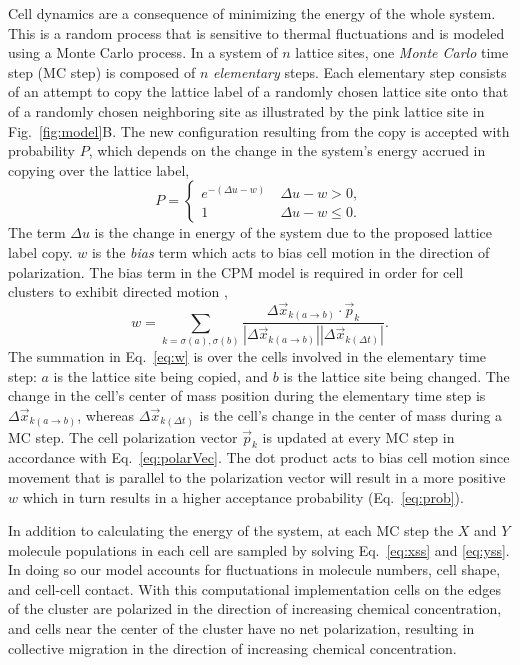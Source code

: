 Cell dynamics are a consequence of minimizing the energy of the whole system. This is a random process that is sensitive to thermal fluctuations and is modeled using a Monte Carlo process. In a system of $n$ lattice sites, one \textit{Monte Carlo} time step (MC step) is composed of $n$ \textit{elementary} steps. Each elementary step consists of an attempt to copy the lattice label of a randomly chosen lattice site onto that of a randomly chosen neighboring site as illustrated by the pink lattice site in Fig.\ \ref{fig:model}B. The new configuration resulting from the copy is accepted with probability $P$, which depends on the change in the system's energy accrued in copying over the lattice label,
\begin{equation} \label{eq:prob}
    P =
    \begin{cases}
        e^{-\left( \Delta u - w \right)} &\ \Delta u - w > 0 , \\
        1 &\ \Delta u - w \leq 0 .
    \end{cases}
\end{equation}
The term $\Delta u$ is the change in energy of the system due to the proposed lattice label copy. $w$ is the \textit{bias} term which acts to bias cell motion in the direction of polarization. The bias term in the CPM model is required in order for cell clusters to exhibit directed motion \cite{szabo2010collective},
\begin{equation} \label{eq:w}
    w = \sum_{k=\sigma(a),\sigma(b)} \frac{\Delta\vec{x}_{k(a \to b)} \cdot \vec{p}_k}{ |\Delta\vec{x}_{k(a \to b)}| |\Delta\vec{x}_{k(\Delta t)}|}.
\end{equation}
The summation in Eq.\ \ref{eq:w} is over the cells involved in the elementary time step: $a$ is the lattice site being copied, and $b$ is the lattice site being changed. The change in the cell's center of mass position during the elementary time step is $\Delta\vec{x}_{k(a \to b)}$, whereas $\Delta\vec{x}_{k(\Delta t)}$ is the cell's change in the center of mass during a MC step. The cell polarization vector $\vec{p}_k$ is updated at every MC step in accordance with Eq.\ \ref{eq:polarVec}. The dot product acts to bias cell motion since movement that is parallel to the polarization vector will result in a more positive $w$ which in turn results in a higher acceptance probability (Eq.\ \ref{eq:prob}).

In addition to calculating the energy of the system, at each MC step the $X$ and $Y$ molecule populations in each cell are sampled by solving Eq.\ \ref{eq:xss} and \ref{eq:yss}. In doing so our model accounts for fluctuations in molecule numbers, cell shape, and cell-cell contact. With this computational implementation cells on the edges of the cluster are polarized in the direction of increasing chemical concentration, and cells near the center of the cluster have no net polarization, resulting in collective migration in the direction of increasing chemical concentration.


